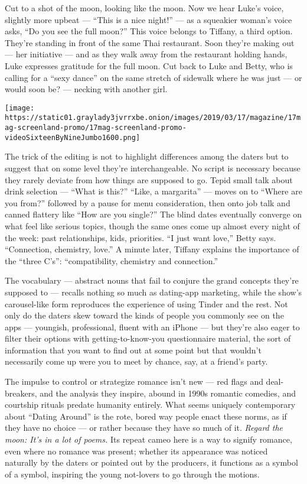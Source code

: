 Cut to a shot of the moon, looking like the moon. Now we hear Luke's
voice, slightly more upbeat --- ``This is a nice night!'' --- as a
squeakier woman's voice asks, ``Do you see the full moon?'' This voice
belongs to Tiffany, a third option. They're standing in front of the
same Thai restaurant. Soon they're making out --- her initiative --- and
as they walk away from the restaurant holding hands, Luke expresses
gratitude for the full moon. Cut back to Luke and Betty, who is calling
for a ``sexy dance'' on the same stretch of sidewalk where he was just
--- or would soon be? --- necking with another girl.

\texttt{[image: https://static01.graylady3jvrrxbe.onion/images/2019/03/17/magazine/17mag-screenland-promo/17mag-screenland-promo-videoSixteenByNineJumbo1600.png]}

The trick of the editing is not to highlight differences among the
daters but to suggest that on some level they're interchangeable. No
script is necessary because they rarely deviate from how things are
supposed to go. Tepid small talk about drink selection --- ``What is
this?'' ``Like, a margarita'' --- moves on to ``Where are you from?''
followed by a pause for menu consideration, then onto job talk and
canned flattery like ``How are you single?'' The blind dates eventually
converge on what feel like serious topics, though the same ones come up
almost every night of the week: past relationships, kids, priorities.
``I just want love,'' Betty says. ``Connection, chemistry, love.'' A
minute later, Tiffany explains the importance of the ``three C's'':
``compatibility, chemistry and connection.''

The vocabulary --- abstract nouns that fail to conjure the grand
concepts they're supposed to --- recalls nothing so much as dating-app
marketing, while the show's carousel-like form reproduces the experience
of using Tinder and the rest. Not only do the daters skew toward the
kinds of people you commonly see on the apps --- youngish, professional,
fluent with an iPhone --- but they're also eager to filter their options
with getting-to-know-you questionnaire material, the sort of information
that you want to find out at some point but that wouldn't necessarily
come up were you to meet by chance, say, at a friend's party.

The impulse to control or strategize romance isn't new --- red flags and
deal-breakers, and the analysis they inspire, abound in 1990s romantic
comedies, and courtship rituals predate humanity entirely. What seems
uniquely contemporary about ``Dating Around'' is the rote, bored way
people enact these norms, as if they have no choice --- or rather
because they have so much of it. \emph{Regard the moon: It's in a lot of
poems.} Its repeat cameo here is a way to signify romance, even where no
romance was present; whether its appearance was noticed naturally by the
daters or pointed out by the producers, it functions as a symbol of a
symbol, inspiring the young not-lovers to go through the motions.

